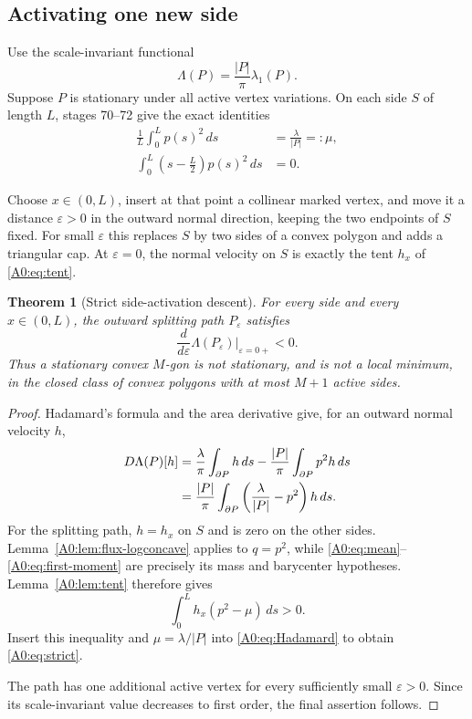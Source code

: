 \documentclass[11pt]{amsart}
\numberwithin{equation}{section}
\newtheorem{theorem}{Theorem}[section]
\theoremstyle{definition}
\theoremstyle{remark}
\begin{document}
\subsection{Activating one new side}

Use the scale-invariant functional
\begin{equation}\label{A0:eq:Lambda}
 \Lambda(P)=\frac{|P|}{\pi}\lambda_1(P).
\end{equation}
Suppose \(P\) is stationary under all active vertex variations.  On each
side \(S\) of length \(L\), stages 70--72 give the exact identities
\begin{align}
 \frac1L\int_0^Lp(s)^2\,ds&=\frac{\lambda}{|P|}=:\mu,
 \label{A0:eq:mean}\\
 \int_0^L\left(s-\frac L2\right)p(s)^2\,ds&=0.
 \label{A0:eq:first-moment}
\end{align}

Choose \(x\in(0,L)\), insert at that point a collinear marked vertex, and
move it a distance \(\varepsilon>0\) in the outward normal direction,
keeping the two endpoints of \(S\) fixed.  For small \(\varepsilon\) this
replaces \(S\) by two sides of a convex polygon and adds a triangular cap.
At \(\varepsilon=0\), the normal velocity on \(S\) is exactly the tent
\(h_x\) of \eqref{A0:eq:tent}.

\begin{theorem}[Strict side-activation descent]\label{A0:thm:descent}
For every side and every \(x\in(0,L)\), the outward splitting path
\(P_\varepsilon\) satisfies
\begin{equation}\label{A0:eq:strict}
 \boxed{
 \frac d{d\varepsilon}\Lambda(P_\varepsilon)
 \bigg|_{\varepsilon=0+}<0.}
\end{equation}
Thus a stationary convex \(M\)-gon is not stationary, and is not a local
minimum, in the closed class of convex polygons with at most \(M+1\)
active sides.
\end{theorem}

\begin{proof}
Hadamard's formula and the area derivative give, for an outward normal
velocity \(h\),
\begin{align}
 D\Lambda(P)[h]
 &=\frac{\lambda}{\pi}\int_{\partial P}h\,ds
   -\frac{|P|}{\pi}\int_{\partial P}p^2h\,ds\notag\\
 &=\frac{|P|}{\pi}\int_{\partial P}
   \left(\frac{\lambda}{|P|}-p^2\right)h\,ds.
 \label{A0:eq:Hadamard}
\end{align}
For the splitting path, \(h=h_x\) on \(S\) and is zero on the other
sides.  Lemma~\ref{A0:lem:flux-logconcave} applies to \(q=p^2\), while
\eqref{A0:eq:mean}--\eqref{A0:eq:first-moment} are precisely its mass and
barycenter hypotheses.  Lemma~\ref{A0:lem:tent} therefore gives
\[
 \int_0^Lh_x(p^2-\mu)\,ds>0.
\]
Insert this inequality and \(\mu=\lambda/|P|\) into
\eqref{A0:eq:Hadamard} to obtain \eqref{A0:eq:strict}.

The path has one additional active vertex for every sufficiently small
\(\varepsilon>0\).  Since its scale-invariant value decreases to first
order, the final assertion follows.
\end{proof}
\end{document}

